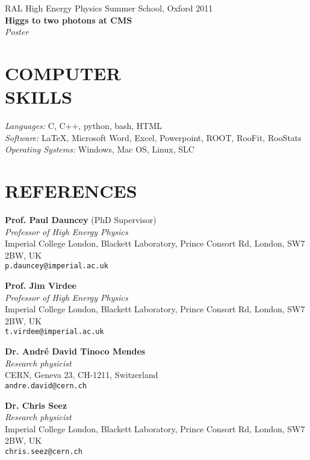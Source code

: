 \documentclass[margin, 10pt]{res} %
\begin{document}
\begin{resume}
RAL High Energy Physics Summer School, Oxford 2011 \\
\textbf{Higgs to two photons at CMS} \\
\textit{Poster}


\section{COMPUTER \\ SKILLS} 

{\sl Languages:} 
C, C++, python, bash, HTML \\
{\sl Software:} 
\LaTeX, Microsoft Word, Excel, Powerpoint, ROOT, RooFit, RooStats \\
{\sl Operating Systems:} 
Windows, Mac OS, Linux, SLC 


\section{REFERENCES}
\textbf{Prof. Paul Dauncey} (PhD Supervisor) \\
\textit{Professor of High Energy Physics} \\
Imperial College London, Blackett Laboratory, Prince Consort Rd, London, SW7 2BW, UK \\
\texttt{p.dauncey@imperial.ac.uk} 

\textbf{Prof. Jim Virdee} \\
\textit{Professor of High Energy Physics} \\
Imperial College London, Blackett Laboratory, Prince Consort Rd, London, SW7 2BW, UK \\
\texttt{t.virdee@imperial.ac.uk}

\textbf{Dr. Andr\'{e} David Tinoco Mendes} \\
\textit{Research physicist} \\
CERN, Geneva 23, CH-1211, Switzerland \\
\texttt{andre.david@cern.ch} 

\textbf{Dr. Chris Seez} \\
\textit{Research physicist} \\
Imperial College London, Blackett Laboratory, Prince Consort Rd, London, SW7 2BW, UK \\
\texttt{chris.seez@cern.ch} 


\end{resume}
\end{document}
